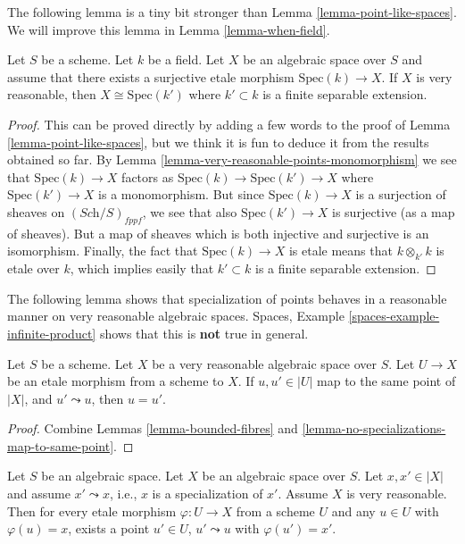 \noindent
The following lemma is a tiny bit stronger than
Lemma \ref{lemma-point-like-spaces}.
We will improve this lemma in Lemma \ref{lemma-when-field}.

\begin{lemma}
\label{lemma-very-reasonable-point-like-spaces}
Let $S$ be a scheme. Let $k$ be a field.
Let $X$ be an algebraic space over $S$ and assume that there exists
a surjective etale morphism $\text{Spec}(k) \to X$.
If $X$ is very reasonable, then $X \cong \text{Spec}(k')$
where $k' \subset k$ is a finite separable extension.
\end{lemma}

\begin{proof}
This can be proved directly by adding a few words to the proof of
Lemma \ref{lemma-point-like-spaces},
but we think it is fun to deduce it from the results obtained so far.
By Lemma \ref{lemma-very-reasonable-points-monomorphism}
we see that $\text{Spec}(k) \to X$ factors as
$\text{Spec}(k) \to \text{Spec}(k') \to X$ where
$\text{Spec}(k') \to X$ is a monomorphism. But since $\text{Spec}(k) \to X$
is a surjection of sheaves on $(\textit{Sch}/S)_{fppf}$, we see that
also $\text{Spec}(k') \to X$ is surjective (as a map of sheaves). But a
map of sheaves which is both injective and surjective is an isomorphism.
Finally, the fact that $\text{Spec}(k) \to X$ is etale means that
$k \otimes_{k'} k$ is etale over $k$, which implies easily that
$k' \subset k$ is a finite separable extension.
\end{proof}

\noindent
The following lemma shows that specialization of points behaves in a
reasonable manner on very reasonable algebraic spaces.
Spaces, Example \ref{spaces-example-infinite-product}
shows that this is {\bf not} true in general.

\begin{lemma}
\label{lemma-very-reasonable-no-specializations-map-to-same-point}
Let $S$ be a scheme.
Let $X$ be a very reasonable algebraic space over $S$.
Let $U \to X$ be an etale morphism from a scheme to $X$.
If $u, u' \in |U|$ map to the same point of $|X|$, and
$u' \leadsto u$, then $u = u'$.
\end{lemma}

\begin{proof}
Combine Lemmas \ref{lemma-bounded-fibres} and
\ref{lemma-no-specializations-map-to-same-point}.
\end{proof}

\begin{lemma}
\label{lemma-very-reasonable-specialization}
Let $S$ be an algebraic space.
Let $X$ be an algebraic space over $S$.
Let $x, x' \in |X|$ and assume $x' \leadsto x$, i.e., $x$ is a
specialization of $x'$.
Assume $X$ is very reasonable. Then for every etale morphism
$\varphi : U \to X$ from a scheme $U$ and any $u \in U$ with
$\varphi(u) = x$, exists a point $u'\in U$, $u' \leadsto u$ with
$\varphi(u') = x'$.
\end{lemma}


